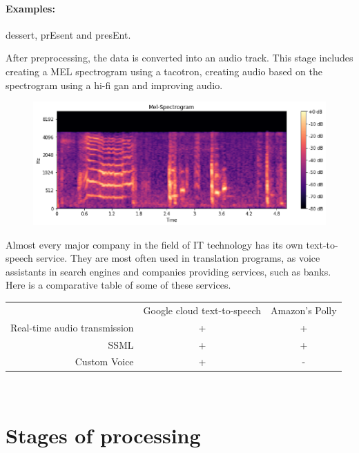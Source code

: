 \documentclass[10pt,a4paper]{report}
\begin{document}
\paragraph{Examples:} dessert, prEsent and presEnt.
\newline

\noindent After preprocessing, the data is converted into an audio track. This stage includes creating a MEL spectrogram using a tacotron, creating audio based on the spectrogram using a hi-fi gan and improving audio.
\newpage

\begin{figure}[h]
\centering
    \includegraphics[width=1.2\linewidth]{first.png}
    \label{fig:mpr}
\end{figure}


\noindent Almost every major company in the field of IT technology has its own text-to-speech service. They are most often used in translation programs, as voice assistants in search engines and companies providing 
services, such as banks. Here is a comparative table of some of these services.
\newline
\newline

\begin{tabular}{ r|c|c| }
	\multicolumn{1}{r}{} &  \multicolumn{1}{c}{Google cloud text-to-speech } & \multicolumn{1}{c}{Amazon’s Polly}\\
	Real-time audio transmission & + & + \\
	\cline{2-3} SSML & + & +\\
	\cline{2-3} Custom Voice & + & - \\

\end{tabular} \\ 
\newpage



\section{Stages of processing}
\end{document}
